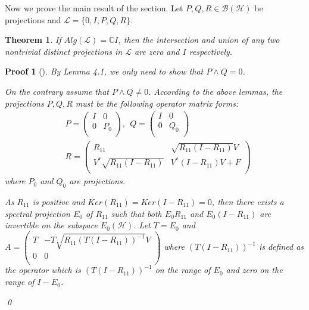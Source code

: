 \documentclass{jaums}
\theoremstyle{thmit} %
\newtheorem{theorem}{Theorem}[section]
\theoremstyle{thmrm} %
\newtheorem*{oldproof}{Proof}
\renewenvironment{proof}[1][{}]{\begin{oldproof}[#1]}{\qed\end{oldproof}}
\begin{document}
 Now we prove the main result of the section.
Let $P,Q,R\in\mathcal{B}(\mathcal{H})$ be projections and $\mathcal{L}=\{0, I,
P,Q,R\}$.
\begin{theorem} If $Alg(\mathcal{L})=\mathbb{C}I$, then the intersection and
union of any two nontrivial distinct projections in $\mathcal{L}$ are zero
and $I$ respectively.
\end{theorem}

\begin{proof} By Lemma 4.1, we only need to show that $P\wedge Q=0$.

On the contrary assume that $P\wedge Q\neq0$. According to the above lemmas,
the projections $P,Q,R$ must be the following operator matrix forms:
\begin{align*}
&P=\left(
      \begin{array}{cc}
        I & 0  \\
        0 & P_0 \\
      \end{array}
    \right), \   \ Q=\left(
      \begin{array}{cc}
        I & 0  \\
        0 & Q_0 \\
        \end{array}
    \right)\\
&R=\left(
      \begin{array}{cc}
        R_{11} & \sqrt{R_{11}(I-R_{11})}V  \\
        V^{*}\sqrt{R_{11}(I-R_{11})} & V^{*}(I-R_{11})V+F \\
      \end{array}
    \right)
\end{align*}
where $P_0$ and $Q_0$ are projections.

As $R_{11}$ is positive and $Ker(R_{11})=Ker(I-R_{11})=0$, then there exists a
spectral projection $E_{0}$ of $R_{11}$ such that both $E_{0}R_{11}$ and
$E_{0}(I-R_{11})$ are invertible on the subspace $E_{0}(\mathcal{H})$. Let
$T=E_{0}$ and $A=\left(
      \begin{array}{cc}
        T & -T\sqrt{R_{11}(T(I-R_{11}))^{-1}}V  \\
        0 & 0  \\
      \end{array}
    \right)$ where $(T(I-R_{11}))^{-1}$ is defined as the operator which is
$(T(I-R_{11}))^{-1}$ on the range of $E_{0}$ and zero on the range of $I-E_{0}$.


\end{proof}
\end{document}
